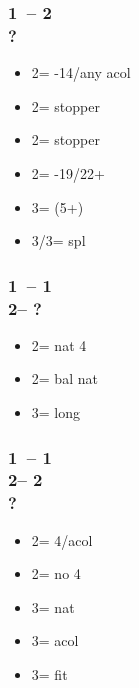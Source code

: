 \documentclass[12pt, a4paper]{report}
\begin{document}
\begin{bidpage}
\subsubsection*{1\clubs\ -- 2\clubs\\
                ?}
\begin{itemize}
    \item 2\diams = -14/any acol
    \item 2\hearts = stopper
    \item 2\spades = stopper
    \item 2\nt = -19/22+
    \item 3\clubs = \nat (5+)
    \item 3\diams/3\major = spl
\end{itemize}
\end{bidpage}

\begin{bidpage}
    \subsubsection*{1\clubs\ -- 1\clubs\\
                2\diams -- ?}
\begin{itemize}
    \item 2\major = nat 4\major
    \item 2\nt = bal nat \clubs
    \item 3\clubs = long \clubs
\end{itemize}
\end{bidpage}

\begin{bidpage}
\subsubsection*{1\clubs\ -- 1\clubs\\
                2\diams -- 2\hearts\\
                ?}
\begin{itemize}
    \item 2\spades = 4\spades/acol \spades
    \item 2\nt = no 4\major
    \item 3\clubs = nat \clubs
    \item 3\diams = acol
    \item 3\hearts = fit
\end{itemize}
\end{bidpage}
\end{document}
